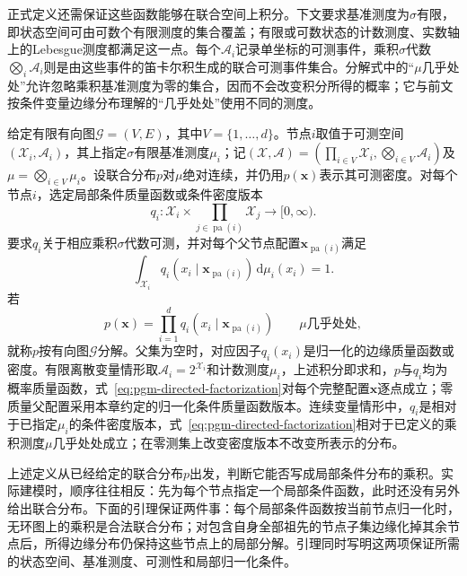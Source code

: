 正式定义还需保证这些函数能够在联合空间上积分。下文要求基准测度为$\sigma$有限，即状态空间可由可数个有限测度的集合覆盖；有限或可数状态的计数测度、实数轴上的Lebesgue测度都满足这一点。每个$\mathcal A_i$记录单坐标的可测事件，乘积$\sigma$代数$\bigotimes_i\mathcal A_i$则是由这些事件的笛卡尔积生成的联合可测事件集合。分解式中的“$\mu$几乎处处”允许忽略乘积基准测度为零的集合，因而不会改变积分所得的概率；它与前文按条件变量边缘分布理解的“几乎处处”使用不同的测度。

\begin{definition}[按有向图分解]
  \label{def:pgm-directed-factorization}
  给定有限有向图$\mathcal{G}=(V,E)$，其中$V=\{1,\ldots,d\}$。节点$i$取值于可测空间$(\mathcal{X}_i,\mathcal{A}_i)$，其上指定$\sigma$有限基准测度$\mu_i$；记$(\mathcal{X},\mathcal{A})=(\prod_{i\in V}\mathcal{X}_i,\bigotimes_{i\in V}\mathcal{A}_i)$及$\mu=\bigotimes_{i\in V}\mu_i$。设联合分布$p$对$\mu$绝对连续，并仍用$p(\bm{x})$表示其可测密度。对每个节点$i$，选定局部条件质量函数或条件密度版本
  \[
    q_i:
    \mathcal{X}_i\times
    \prod_{j\in\operatorname{pa}(i)}\mathcal{X}_j
    \longrightarrow[0,\infty).
  \]
  要求$q_i$关于相应乘积$\sigma$代数可测，并对每个父节点配置$\bm{x}_{\operatorname{pa}(i)}$满足
  \[
    \int_{\mathcal{X}_i}
    q_i(x_i\mid\bm{x}_{\operatorname{pa}(i)})\,\mathrm{d}\mu_i(x_i)=1.
  \]
  若
  \begin{equation}
    p(\bm{x})=\prod_{i=1}^{d}
      q_i(x_i\mid\bm{x}_{\operatorname{pa}(i)})
      \qquad\text{$\mu$几乎处处},
    \label{eq:pgm-directed-factorization}
  \end{equation}
  就称$p$按有向图$\mathcal{G}$分解。父集为空时，对应因子$q_i(x_i)$是归一化的边缘质量函数或密度。有限离散变量情形取$\mathcal{A}_i=2^{\mathcal{X}_i}$和计数测度$\mu_i$，上述积分即求和，$p$与$q_i$均为概率质量函数，式~\eqref{eq:pgm-directed-factorization}对每个完整配置$\bm{x}$逐点成立；零质量父配置采用本章约定的归一化条件质量函数版本。连续变量情形中，$q_i$是相对于已指定$\mu_i$的条件密度版本，式~\eqref{eq:pgm-directed-factorization}相对于已定义的乘积测度$\mu$几乎处处成立；在零测集上改变密度版本不改变所表示的分布。
\end{definition}

上述定义从已经给定的联合分布$p$出发，判断它能否写成局部条件分布的乘积。实际建模时，顺序往往相反：先为每个节点指定一个局部条件函数，此时还没有另外给出联合分布。下面的引理保证两件事：每个局部条件函数按当前节点归一化时，无环图上的乘积是合法联合分布；对包含自身全部祖先的节点子集边缘化掉其余节点后，所得边缘分布仍保持这些节点上的局部分解。引理同时写明这两项保证所需的状态空间、基准测度、可测性和局部归一化条件。

